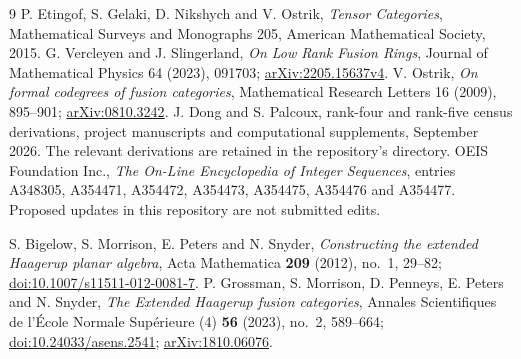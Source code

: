 \documentclass[11pt,a4paper]{article}
\theoremstyle{definition}\newtheorem{definition}[theorem]{Definition}\newtheorem{remark}[theorem]{Remark}
\begin{document}
\begin{thebibliography}{9}\small\setlength{\itemsep}{2pt}
 P. Etingof, S. Gelaki, D. Nikshych and V. Ostrik,
\emph{Tensor Categories}, Mathematical Surveys and Monographs 205,
American Mathematical Society, 2015.
 G. Vercleyen and J. Slingerland,
\emph{On Low Rank Fusion Rings}, Journal of Mathematical Physics 64 (2023),
091703; \href{https://arxiv.org/abs/2205.15637v4}{arXiv:2205.15637v4}.
 V. Ostrik, \emph{On formal codegrees of fusion categories},
Mathematical Research Letters 16 (2009), 895--901;
\href{https://arxiv.org/abs/0810.3242}{arXiv:0810.3242}.
 J. Dong and S. Palcoux, rank-four and rank-five census derivations,
project manuscripts and computational supplements, September 2026.
The relevant derivations are retained in the repository's  directory.
 OEIS Foundation Inc., \emph{The On-Line Encyclopedia of Integer
Sequences}, entries A348305, A354471, A354472, A354473, A354475, A354476
and A354477. Proposed updates in this repository are not submitted edits.

 S. Bigelow, S. Morrison, E. Peters and N. Snyder,
\emph{Constructing the extended Haagerup planar algebra},
Acta Mathematica \textbf{209} (2012), no.~1, 29--82;
\href{https://doi.org/10.1007/s11511-012-0081-7}{doi:10.1007/s11511-012-0081-7}.
 P. Grossman, S. Morrison, D. Penneys, E. Peters and N. Snyder,
\emph{The Extended Haagerup fusion categories},
Annales Scientifiques de l'\'Ecole Normale Sup\'erieure (4) \textbf{56} (2023),
no.~2, 589--664;
\href{https://doi.org/10.24033/asens.2541}{doi:10.24033/asens.2541};
\href{https://arxiv.org/abs/1810.06076}{arXiv:1810.06076}.
\end{thebibliography}
\end{document}
